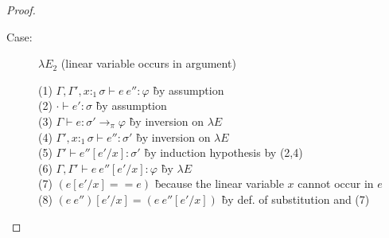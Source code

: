 \begin{proof}
\begin{description}
\item[Case:] $\lambda E_2$ (linear variable occurs in argument)
\begin{tabbing}
  (1) $\Gamma, \Gamma', x{:}_1\sigma \vdash e~e'' : \varphi$ \` by assumption\\
  (2) $\cdot \vdash e' : \sigma$ \` by assumption\\
  (3) $\Gamma \vdash e : \sigma' \to_\pi \varphi$ \` by inversion on $\lambda E$\\
  (4) $\Gamma', x{:}_1\sigma \vdash e'' : \sigma'$ \` by inversion on $\lambda E$\\
  (5) $\Gamma' \vdash e''[e'/x] : \sigma'$ \` by induction hypothesis by (2,4)\\
  (6) $\Gamma, \Gamma' \vdash e~e''[e'/x] : \varphi$ \` by $\lambda E$\\
  (7) $(e[e'/x] == e)$ \` because the linear variable $x$ cannot occur in $e$\\
  (8) $(e~e'')[e'/x] = (e~e''[e'/x])$ \` by def. of substitution and (7)\\
\end{tabbing}

\end{description}

\end{proof}

